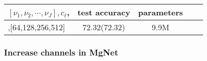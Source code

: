 \begin{enumerate}
\begin{table}[!htbp]
    \begin{center}
        \begin{tabular}{| l | c | c | c | r |}
        \hline
        $[\nu_1,\nu_2,\cdots,\nu_J], c_\ell$,  &  test accuracy & parameters
        \tabularnewline
        \hline
        [2,2,2,2],[64,128,256,512]             &   72.32(72.32) &   9.9M
        \tabularnewline
        \hline
        \end{tabular}
    \end{center}
\end{table}

\end{enumerate}


\subsubsection{Increase channels in MgNet}
